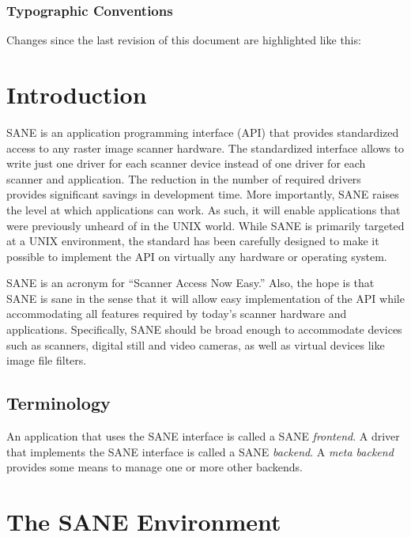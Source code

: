 \documentclass[11pt,DVIps]{report}
\begin{document}
\subsection{Typographic Conventions}

Changes since the last revision of this document are highlighted
like this:


\chapter{Introduction}\label{chap:intro}

SANE is an application programming interface (API) that provides
standardized access to any raster image scanner hardware.  The
standardized interface allows to write just one driver for each
scanner device instead of one driver for each scanner and application.
The reduction in the number of required drivers provides significant
savings in development time.  More importantly, SANE raises the level
at which applications can work.  As such, it will enable applications
that were previously unheard of in the UNIX world.  While SANE is
primarily targeted at a UNIX environment, the standard has been
carefully designed to make it possible to implement the API on
virtually any hardware or operating system.

SANE is an acronym for ``Scanner Access Now Easy.''  Also, the hope is
that SANE is sane in the sense that it will allow easy implementation
of the API while accommodating all features required by today's
scanner hardware and applications.  Specifically, SANE should be broad
enough to accommodate devices such as scanners, digital still and
video cameras, as well as virtual devices like image file filters.

\section{Terminology}

An application that uses the SANE interface is called a SANE {\em
  frontend}.  A driver that implements the SANE interface is called a
SANE {\em backend}.  A {\em meta backend\/} provides some means to
manage one or more other backends.


\chapter{The SANE Environment}\label{chap:environ}
\end{document}
